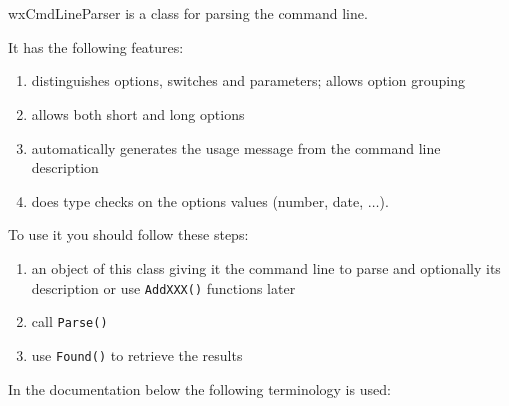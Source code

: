 
\section{}\label{wxcmdlineparser}

wxCmdLineParser is a class for parsing the command line.

It has the following features:

\begin{enumerate}\itemsep=0pt
\item distinguishes options, switches and parameters; allows option grouping
\item allows both short and long options
\item automatically generates the usage message from the command line description
\item does type checks on the options values (number, date, $\ldots$).
\end{enumerate}

To use it you should follow these steps:

\begin{enumerate}\itemsep=0pt
\item {} an object of this class
giving it the command line to parse and optionally its description or use 
{\tt AddXXX()} functions later
\item call {\tt Parse()}
\item use {\tt Found()} to retrieve the results
\end{enumerate}

In the documentation below the following terminology is used:

\begin{twocollist}\itemsep=0pt
\end{twocollist}

